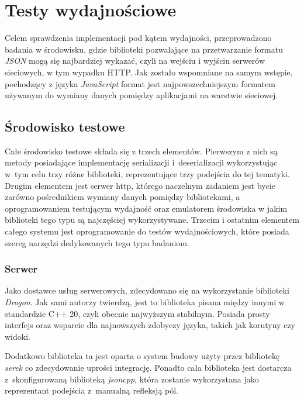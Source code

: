 \documentclass[12pt]{article}
\newcommand{\n}{\newline}
\begin{document}
	{
		\section{Testy wydajnościowe}

		Celem sprawdzenia implementacji pod kątem wydajności, przeprowadzono badania w środowisku, gdzie biblioteki pozwalające na przetwarzanie
		formatu {\it JSON} mogą się najbardziej wykazać, czyli na wejściu i wyjściu serwerów sieciowych, w tym wypadku HTTP. Jak zostało wspomniane
		na samym wstępie, pochodzący z języka {\it JavaScript} format jest najpowszechniejszym formatem\cite{google_trends_json_api_vs_rest_of_the_world}
		używanym do wymiany danych pomiędzy aplikacjami na warstwie sieciowej.

		{
			\subsection{Środowisko testowe}

			Całe środowisko testowe składa się z trzech elementów. Pierwszym z nich są metody posiadające implementację serializacji i~deserializacji
			wykorzystując w~tym celu trzy różne biblioteki, reprezentujące trzy podejścia do tej tematyki. Drugim elementem jest serwer http, którego
			naczelnym zadaniem jest bycie zarówno pośrednikiem wymiany danych pomiędzy bibliotekami, a oprogramowaniem testującym wydajność oraz
			emulatorem środowiska w jakim biblioteki tego typu są najczęściej wykorzystywane. Trzecim i ostatnim elementem całego systemu jest
			oprogramowanie do testów wydajnościowych, które posiada szereg narzędzi dedykowanych tego typu badaniom.

			{
				\subsubsection{Serwer}

				Jako dostawce usług serwerowych, zdecydowano się na wykorzystanie biblioteki {\it Drogon}\cite{drogon}. Jak sami autorzy twierdzą,
				jest to biblioteka pisana między innymi w standardzie C++ 20, czyli obecnie najwyższym stabilnym. Posiada prosty interfejs oraz
				wsparcie dla najnowszych zdobyczy języka, takich jak korutyny czy widoki.\n

				Dodatkowo biblioteka ta jest oparta o system budowy użyty przez bibliotekę {\it serek} co zdecydowanie uprości integrację. Ponadto
				cała biblioteka jest dostarcza z~skonfigurowaną biblioteką {\it jsoncpp}\cite{jsoncpp_repo}, która zostanie wykorzystana jako
				reprezentant podejścia z~manualną refleksją pól.\n

}}}
\end{document}
